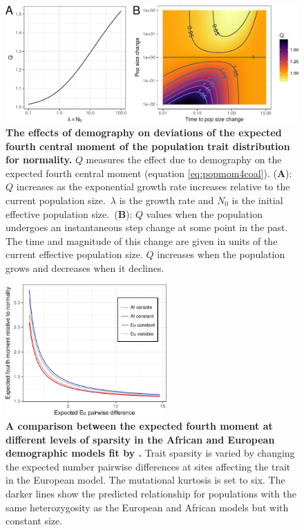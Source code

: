 \begin{figure}
\centering
\includegraphics[width=\textwidth]{./figures/combo_q.pdf}

\caption{
\textbf{The effects of demography on deviations of the expected
fourth central moment of the population trait distribution for normality.} $Q$
measures the effect due to demography on the expected fourth central moment
(equation \eqref{eq:popmom4coal}). (\textbf{A}): $Q$ increases as the
exponential growth rate increases relative to the current population
size.~$\lambda$ is the growth rate and $N_0$ is the initial effective population
size.~(\textbf{B}): $Q$ values when the population undergoes an instantaneous
step change at some point in the past. The time and magnitude of this change are
given in units of the current effective population size. $Q$ increases when the
population grows and decreases when it declines.}

\label{fig:Qexp}
\end{figure}

\begin{figure}
\centering
\includegraphics[width=0.55\textwidth]{./figures/af_eu_mom4_r.pdf}
\caption{ \textbf{A comparison between the expected fourth moment at different levels of
sparsity in the African and European demographic models fit
by \citet{Tennessen2012}.} Trait sparsity is varied by changing the expected
number pairwise differences at sites affecting the trait in the European model.
The mutational kurtosis is set to six. The darker lines show the predicted
relationship for populations with the same heterozygosity as the European and
African models but with constant size.}
\label{fig:afeucomp}
\end{figure}

